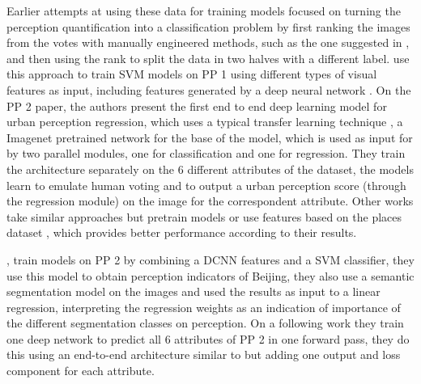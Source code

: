 Earlier attempts at using these data for training models focused on turning the perception quantification into a classification problem
by first ranking the images from the votes with manually engineered methods, such as the one suggested in
, and then using the rank to split the data in two halves with a different
label.  use this approach to train SVM models on PP 1 using different types of visual features as input,
including features generated by a  deep neural network \cite{donahue_deep}. On the PP 2 paper, the authors present the first end to end deep learning model for
urban perception regression, which uses a typical transfer learning technique \cite{survey_transfer}, a
Imagenet \cite{imagenet} pretrained  network for the base of the model, which is used as input
for by two parallel modules, one for classification and one for regression. They train the architecture
separately on the 6 different attributes of the dataset, the models learn to emulate human voting and
to output a urban perception score (through the regression module) on the image for the correspondent attribute.
Other works \cite{porzi_predicting, santani} take similar approaches but pretrain models or use features based on
the places dataset \cite{zhou_places}, which provides better performance according to their results.


, train models on PP 2 by combining a DCNN features and a SVM classifier, they use this model to
obtain perception indicators of Beijing, they also use a semantic segmentation model \cite{cordts_cityscapes} on the images and used the results
as input to a linear regression, interpreting the regression weights as an indication of importance of the different segmentation
classes on perception. On a following work \cite{zhang_uncovering} they train one deep network to predict all 6 attributes of PP 2
in one forward pass, they do this using an end-to-end architecture similar to  but adding
one output and loss component for each attribute.

